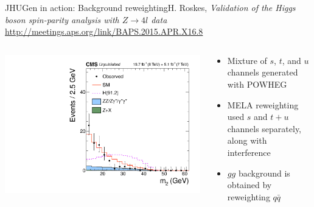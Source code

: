 \documentclass[usenames,dvipsnames,svgnames,table]{beamer}
\begin{document}
\begin{frame}{JHUGen in action: Background reweighting}{H. Roskes, \emph{Validation of the Higgs boson spin-parity
analysis with $Z\to 4l$ data}\\ \url{http://meetings.aps.org/link/BAPS.2015.APR.X16.8}}
\begin{columns}
\begin{column}{0.55\textwidth}
\includegraphics[width=.5\columnwidth]{HVV/Z4lm2}
\end{column}
\begin{column}{0.45\textwidth}
\begin{itemize}
\item Mixture of $s$, $t$, and $u$ channels generated with POWHEG
\item MELA reweighting used $s$ and $t+u$ channels separately, along with interference
\item $gg$ background is obtained by reweighting $q\bar{q}$
\end{itemize}
\end{column}
\end{columns}
\end{frame}
\end{document}
